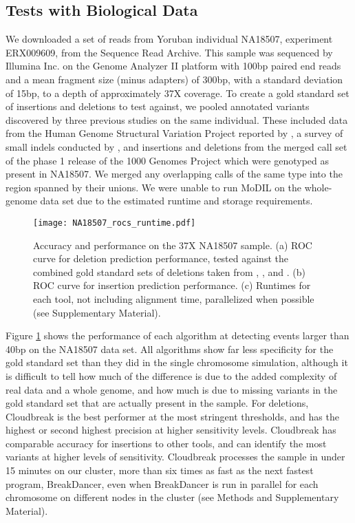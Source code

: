 \documentclass[11pt]{article}
\begin{document}
\subsection{Tests with Biological Data}

We downloaded a set of reads from Yoruban individual NA18507, experiment ERX009609, from the Sequence Read Archive. This sample was sequenced by Illumina Inc. on the Genome Analyzer II platform with 100bp paired end reads and a mean fragment size (minus adapters) of 300bp, with a standard deviation of 15bp, to a depth of approximately 37X coverage. To create a gold standard set of insertions and deletions to test against, we pooled annotated variants discovered by three previous studies on the same individual. These included data from the Human Genome Structural Variation Project reported by \textcite{Kidd:2008p926}, a survey of small indels conducted by \textcite{Mills:2011fi}, and insertions and deletions from the merged call set of the phase 1 release of the 1000 Genomes Project \autocite{GenomesProjectConsortium:2012co} which were genotyped as present in NA18507. We merged any overlapping calls of the same type into the region spanned by their unions. We were unable to run MoDIL on the whole-genome data set due to the estimated runtime and storage requirements.

\begin{figure}
\centering
\texttt{[image: NA18507\_rocs\_runtime.pdf]}
\caption{Accuracy and performance on the 37X NA18507 sample. (a) ROC curve for deletion prediction performance, tested against the combined gold standard sets of deletions taken from \textcite{Kidd:2008p926}, \textcite{Mills:2011fi}, and \textcite{GenomesProjectConsortium:2012co}. (b) ROC curve for insertion prediction performance. (c) Runtimes for each tool, not including alignment time, parallelized when possible (see Supplementary Material). }
\label{NA18507CombinedRoc}
\end{figure}

Figure \ref{NA18507CombinedRoc} shows the performance of each algorithm at detecting events larger than 40bp on the NA18507 data set. All algorithms show far less specificity for the gold standard set than they did in the single chromosome simulation, although it is difficult to tell how much of the difference is due to the added complexity of real data and a whole genome, and how much is due to missing variants in the gold standard set that are actually present in the sample. For deletions, Cloudbreak is the best performer at the most stringent thresholds, and has the highest or second highest precision at higher sensitivity levels. Cloudbreak has comparable accuracy for insertions to other tools, and can identify the most variants at higher levels of sensitivity. Cloudbreak processes the sample in under 15 minutes on our cluster, more than six times as fast as the next fastest program, BreakDancer, even when BreakDancer is run in parallel for each chromosome on different nodes in the cluster (see Methods and Supplementary Material).
\end{document}
